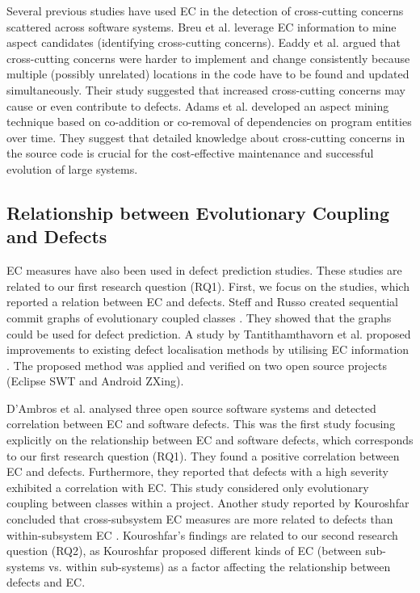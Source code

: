 \documentclass[times]{smrauth}
\begin{document}
Several previous studies have used EC in the detection of cross-cutting concerns scattered across software systems. Breu et al. \cite{breu2006mining} leverage EC information to mine aspect candidates (identifying cross-cutting concerns). Eaddy et al. \cite{eaddy2008crosscutting} argued that cross-cutting concerns were harder to implement and change consistently because multiple (possibly unrelated) locations in the code have to be found and updated simultaneously. Their study suggested that increased cross-cutting concerns may cause or even contribute to defects. Adams et al. \cite{Adams:2010:ICC:1806799.1806846} developed an aspect mining technique based on co-addition or co-removal of dependencies on program entities over time. They suggest that detailed knowledge about cross-cutting concerns in the source code is crucial for the cost-effective maintenance and successful evolution of large systems. 

\subsection{Relationship between Evolutionary Coupling and Defects}

EC measures have also been used in defect prediction studies. These studies are related to our first research question (RQ1). First, we focus on the studies, which reported a relation between EC and defects. Steff and Russo created sequential commit graphs of evolutionary coupled classes \cite{steff2012co}. They showed that the graphs could be used for defect prediction. A study by Tantithamthavorn et al. proposed improvements to existing  defect localisation methods by utilising EC information \cite{tantithamthavorn2013using}. The proposed method was applied and verified on two open source projects (Eclipse SWT and Android ZXing).

D'Ambros et al. \cite{d2009relationship} analysed three open source software systems and detected correlation between EC and software defects. This was the first study focusing explicitly on the relationship between EC and software defects, which corresponds to our first research question (RQ1). They found a positive correlation between EC and defects. Furthermore, they reported that defects with a high severity exhibited a correlation with EC. This study considered only evolutionary coupling between classes within a project. Another study reported by Kouroshfar concluded that cross-subsystem EC measures are more related to defects than within-subsystem EC \cite{kouroshfar2013studying}. Kouroshfar's findings are related to our second research question (RQ2), as Kouroshfar proposed different kinds of EC (between sub-systems vs. within sub-systems) as a factor affecting the relationship between defects and EC.
\end{document}
